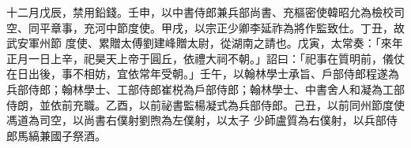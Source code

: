 \begin{pinyinscope}
 十二月戊辰，禁用鉛錢。壬申，以中書侍郎兼兵部尚書、充樞密使韓昭允為檢校司空、同平章事，充河中節度使。甲戌，以宗正少卿李延祚為將作監致仕。丁丑，故武安軍州節
 度使、累贈太傅劉建峰贈太尉，從湖南之請也。戊寅，太常奏：「來年正月一日上辛，祀昊天上帝于圓丘，依禮大祠不朝。」詔曰：「祀事在質明前，儀仗在日出後，事不相妨，宜依常年受朝。」壬午，以翰林學士承旨、戶部侍郎程遂為兵部侍郎；翰林學士、工部侍郎崔棁為戶部侍郎；翰林學士、中書舍人和凝為工部侍朗，並依前充職。乙酉，以前祕書監楊凝式為兵部侍郎。己丑，以前同州節度使馮道為司空，以尚書右僕射劉煦為左僕射，以太子
 少師盧質為右僕射，以兵部侍郎馬縞兼國子祭酒。



\end{pinyinscope}